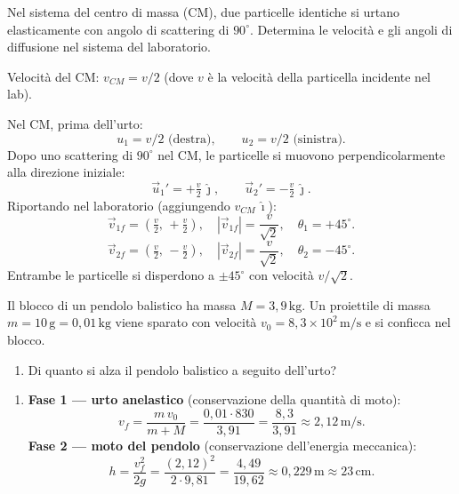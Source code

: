 \begin{question}[ID=4.5, subtitle={Angoli di diffusione nel sistema del laboratorio}, tags={urti nel piano, angolo di diffusione}, difficulty=difficile]
Nel sistema del centro di massa (CM), due particelle identiche si urtano elasticamente con angolo di scattering di \(90^\circ\). Determina le velocità e gli angoli di diffusione nel sistema del laboratorio.
\begin{solution}
    Velocità del CM: \(v_{CM} = v/2\) (dove \(v\) è la velocità della particella incidente nel lab).

    Nel CM, prima dell'urto:
    \[
        u_1 = v/2 \text{ (destra)}, \qquad u_2 = v/2 \text{ (sinistra)}.
    \]
    Dopo uno scattering di \(90^\circ\) nel CM, le particelle si muovono perpendicolarmente alla direzione iniziale:
    \[
        \vec{u}_1' = +\tfrac{v}{2}\,\hat{\jmath}, \qquad \vec{u}_2' = -\tfrac{v}{2}\,\hat{\jmath}.
    \]
    Riportando nel laboratorio (aggiungendo \(v_{CM}\,\hat{\imath}\)):
    \[
        \vec{v}_{1f} = \left(\tfrac{v}{2},\,+\tfrac{v}{2}\right), \quad |\vec{v}_{1f}| = \frac{v}{\sqrt{2}}, \quad \theta_1 = +45^\circ.
    \]
    \[
        \vec{v}_{2f} = \left(\tfrac{v}{2},\,-\tfrac{v}{2}\right), \quad |\vec{v}_{2f}| = \frac{v}{\sqrt{2}}, \quad \theta_2 = -45^\circ.
    \]
    Entrambe le particelle si disperdono a \(\pm 45^\circ\) con velocità \(v/\sqrt{2}\).
\end{solution}
\end{question}


\begin{question}[ID=5.1, subtitle={Altezza massima raggiunta dal pendolo balistico}, tags={pendolo balistico}, difficulty=facile]
Il blocco di un pendolo balistico ha massa \(M = 3{,}9 \, \text{kg}\). Un proiettile di massa \(m = 10 \, \text{g} = 0{,}01 \, \text{kg}\) viene sparato con velocità \(v_0 = 8{,}3 \times 10^2 \, \text{m/s}\) e si conficca nel blocco.
\begin{enumerate}
    \item Di quanto si alza il pendolo balistico a seguito dell'urto?
\end{enumerate}
\begin{solution}
    \begin{enumerate}
        \item \textbf{Fase 1 — urto anelastico} (conservazione della quantità di moto):
        \[
            v_f = \frac{m\, v_0}{m + M} = \frac{0{,}01 \cdot 830}{3{,}91} = \frac{8{,}3}{3{,}91} \approx 2{,}12 \, \text{m/s}.
        \]
        \textbf{Fase 2 — moto del pendolo} (conservazione dell'energia meccanica):
        \[
            h = \frac{v_f^2}{2g} = \frac{(2{,}12)^2}{2 \cdot 9{,}81} = \frac{4{,}49}{19{,}62} \approx 0{,}229 \, \text{m} \approx 23 \, \text{cm}.
        \]
    \end{enumerate}
\end{solution}
\end{question}

